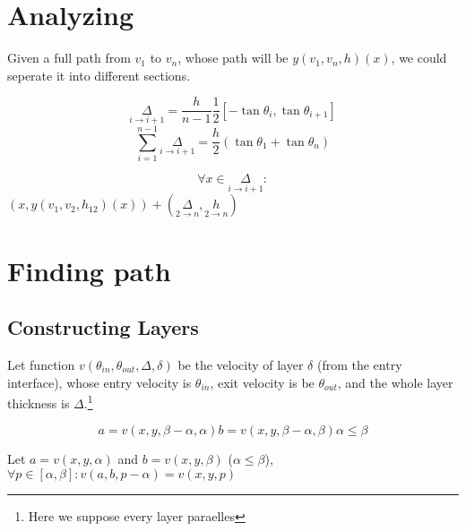 \documentclass[preprint]{ptephy_v1}%
\begin{document}
\section{Analyzing}

Given a full path from $v_1$ to $v_n$, whose path will be $y(v_1, v_n, h)(x)$, we could seperate it into different sections.

\begin{equation}
\underset{i\to i+1}{\Delta}=\frac{h}{n-1}\frac{1}{2}[-\tan\theta_i, \tan\theta_{i+1}]
\end{equation}
\[
\sum_{i=1}^{n-1}\underset{i\to i+1}\Delta=\frac{h}{2}(\tan\theta_1+\tan\theta_n)
\]

\begin{equation}
\forall x\in\underset{i\to i+1}{\Delta}: 
\end{equation}
$(x, y(v_1, v_2, h_{12})(x))+(\underset{2\to{n}}{\Delta}, \underset{2\to{n}}{h})$


\newpage
\section{Finding path}
\subsection{Constructing Layers}
Let function $v(\theta_{in}, \theta_{out}, \Delta, \delta)$ be the velocity of layer $\delta$ (from the entry interface), whose entry velocity is $\theta_{in}$, exit velocity is be $\theta_{out}$, and the whole layer thickness is $\Delta$.\footnote{Here we suppose every layer paraelles}


\begin{subequations}
\begin{equation}
a=v(x, y, \beta-\alpha, \alpha)
\end{equation}
\begin{equation}
b=v(x, y, \beta-\alpha, \beta)
\end{equation}
\begin{equation}
\alpha\leq\beta
\end{equation}
\end{subequations}

Let $a=v(x, y, \alpha)$ and $b=v(x, y, \beta)$ ($\alpha\leq\beta$), $\forall p\in[\alpha, \beta]: v(a, b, p-\alpha)=v(x, y, p)$
\end{document}
